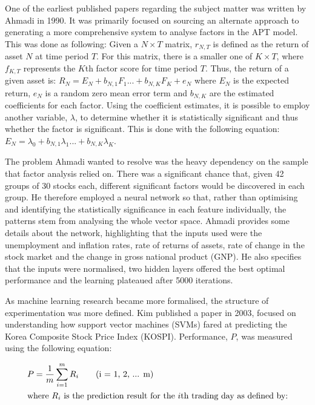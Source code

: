 \documentclass[10pt,onecolumn,letterpaper]{article}
\begin{document}
One of the earliest published papers\cite{Ahmadi} regarding the subject matter was written by Ahmadi in 1990. It was primarily focused on sourcing an alternate approach to generating a more comprehensive system to analyse factors in the APT model. This was done as following: Given a $N\times T$ matrix, $r_{N,T}$ is defined as the return of asset $N$ at time period $T$. For this matrix, there is a smaller one of $K\times T$, where $f_{K,T}$ represents the $K$th factor score for time period $T$. Thus, the return of a given asset is: 
$R_{N} = E_{N} + b_{N,1}F_{1} ... + b_{N,K}F_{K} + e_{N}$ where $E_{N}$ is the expected return, $e_{N}$ is a random zero mean error term and  $b_{N,K}$ are the estimated coefficients for each factor. Using the coefficient estimates, it is possible to employ another variable, $\lambda$, to determine whether it is statistically significant and thus whether the factor is significant. This is done with the following equation: $E_{N} = \lambda_{0} + b_{N,1}\lambda_{1} ... + b_{N,K}\lambda_{K}$.

The problem Ahmadi wanted to resolve was the heavy dependency on the sample that factor analysis relied on. There was a significant chance that, given 42 groups of 30 stocks each, different significant factors would be discovered in each group. He therefore employed a neural network so that, rather than optimising and identifying the statistically significance in each feature individually, the patterns stem from analysing the whole vector space. Ahmadi provides some details about the network, highlighting that the inputs used were the unemployment and inflation rates, rate of returns of assets, rate of change in the stock market and the change in gross national product (GNP). He also specifies that the inputs were normalised, two hidden layers offered the best optimal performance and the learning plateaued after 5000 iterations. 

As machine learning research became more formalised, the structure of experimentation was more defined. Kim published a paper\cite{Kim} in 2003, focused on understanding how support vector machines (SVMs) fared at predicting the Korea Composite Stock Price Index (KOSPI). Performance, $P$, was measured using the following equation: 

\begin{gather*}
 	P = \frac{1}{m} \sum_{i=1}^{m} R_{i} \tag{i = 1, 2, ... m} \\
	\shortintertext{where $R_{i}$ is the prediction result for the $i$th trading day as defined by:} 
\end{gather*}
\end{document}

